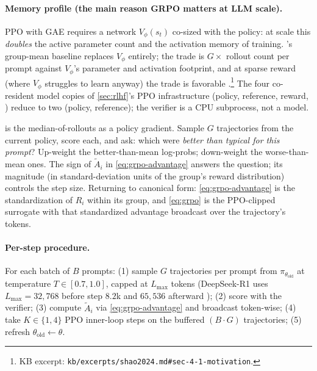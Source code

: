\paragraph{Memory profile (the main reason GRPO matters at LLM
scale).} PPO with GAE \citep[\S 3.5]{ouyang2022-instructgpt} requires a
 network $V_\phi(s_t)$ co-sized with the policy: at  scale this
\emph{doubles} the active parameter count and the activation memory of
training. 's group-mean baseline replaces $V_\phi$ entirely; the
trade is $G \times$ rollout count per prompt against $V_\phi$'s
parameter and activation footprint, and at sparse reward (where $V_\phi$
struggles to learn anyway) the trade is favorable
\citep[\S 4.1]{shao2024}.\footnote{KB excerpt:
\nolinkurl{kb/excerpts/shao2024.md#sec-4-1-motivation}.} The four
co-resident model copies of \cref{sec:rlhf}'s PPO infrastructure
(policy, reference, reward, ) reduce to two (policy, reference);
the verifier is a CPU subprocess, not a model.

\begin{intuition}
 is the median-of-rollouts as a policy gradient. Sample $G$
trajectories from the current policy, score each, and ask: which were
\emph{better than typical for this prompt}? Up-weight the
better-than-mean log-probs; down-weight the worse-than-mean ones. The
sign of $\tilde{A}_i$ in \cref{eq:grpo-advantage} answers the question;
its magnitude (in standard-deviation units of the group's reward
distribution) controls the step size. Returning to canonical form:
\cref{eq:grpo-advantage} is the standardization of $R_i$ within its
group, and \cref{eq:grpo} is the PPO-clipped surrogate with that
standardized advantage broadcast over the trajectory's tokens.
\end{intuition}

\paragraph{Per-step procedure.} For each batch of $B$ prompts: (1)
sample $G$ trajectories per prompt from $\pi_{\theta_{\mathrm{old}}}$ at
temperature $T \in [0.7, 1.0]$, capped at $L_{\max}$ tokens (DeepSeek-R1
uses $L_{\max} = 32{,}768$ before step $8.2$k and $65{,}536$
afterward \citep[\S 2.1]{deepseek-r1}); (2) score with the verifier;
(3) compute $\tilde{A}_i$ via \cref{eq:grpo-advantage} and broadcast
token-wise; (4) take $K \in \{1, 4\}$ PPO inner-loop steps on the
buffered $(B \cdot G)$ trajectories; (5) refresh
$\theta_{\mathrm{old}} \leftarrow \theta$.

